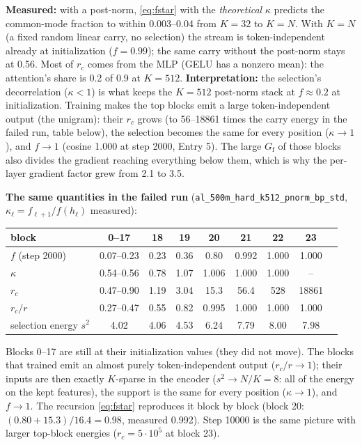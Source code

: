 \documentclass[11pt,a4paper]{article}
\newcommand{\code}[1]{\texttt{#1}}
\newcommand{\Gf}{G_{\mathrm{f}}}
\begin{document}
\textbf{Measured:} with a post-norm, \eqref{eq:fstar} with the \emph{theoretical}
\(\kappa\) predicts the common-mode fraction to within 0.003--0.04 from \(K=32\)
to \(K=N\).  With \(K=N\) (a fixed random linear carry, no selection) the stream
is token-independent already at initialization (\(f=0.99\)); the same carry
without the post-norm stays at 0.56.  Most of \(r_c\) comes from the MLP (GELU
has a nonzero mean): the attention's share is 0.2 of 0.9 at \(K=512\).
\textbf{Interpretation:} the selection's decorrelation (\(\kappa<1\)) is what keeps
the \(K=512\) post-norm stack at \(f\approx0.2\) at initialization.  Training
makes the top blocks emit a large token-independent output (the unigram):
their \(r_c\) grows (to 56--18861 times the carry energy in the failed run,
table below), the selection becomes the same for every position (\(\kappa\to1\)), and
\(f\to1\) (cosine 1.000 at step 2000, Entry 5).  The large \(\Gf\) of those
blocks also divides the gradient reaching everything below them, which is why
the per-layer gradient factor grew from 2.1 to 3.5.

\textbf{The same quantities in the failed run} (\code{al\_500m\_hard\_k512\_pnorm\_bp\_std},
\(\kappa_\ell=f_{\ell+1}/f(h_\ell)\) measured):

\begin{center}\small
\begin{tabular}{lcccccccc}
\toprule
block & 0--17 & 18 & 19 & 20 & 21 & 22 & 23 \\
\midrule
\(f\) (step 2000)            & 0.07--0.23 & 0.23 & 0.36 & 0.80 & 0.992 & 1.000 & 1.000 \\
\(\kappa\)                  & 0.54--0.56 & 0.78 & 1.07 & 1.006 & 1.000 & 1.000 & -- \\
\(r_c\)                     & 0.47--0.90 & 1.19 & 3.04 & 15.3 & 56.4 & 528 & 18861 \\
\(r_c/r\)                   & 0.27--0.47 & 0.55 & 0.82 & 0.995 & 1.000 & 1.000 & 1.000 \\
selection energy \(s^2\)     & 4.02 & 4.06 & 4.53 & 6.24 & 7.79 & 8.00 & 7.98 \\
\bottomrule
\end{tabular}
\end{center}

Blocks 0--17 are still at their initialization values (they did not move).  The
blocks that trained emit an almost purely token-independent output
(\(r_c/r\to1\)); their inputs are then exactly \(K\)-sparse in the encoder
(\(s^2\to N/K=8\): all of the energy on the kept features), the support is the
same for every position (\(\kappa\to1\)), and \(f\to1\).  The recursion
\eqref{eq:fstar} reproduces it block by block (block 20: \((0.80+15.3)/16.4=0.98\),
measured 0.992).  Step 10000 is the same picture with larger top-block energies
(\(r_c=5\cdot10^5\) at block 23).
\end{document}
